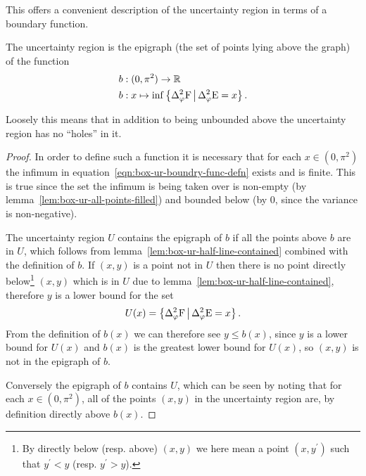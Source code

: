 This offers a convenient description of the uncertainty region in terms of a boundary function.
\begin{thm}
  The uncertainty region is the epigraph (the set of points lying above the graph) of the function
  \begin{align}
    b&:(0,\pi^2) \to \R\\
    b&:x\mapsto \inf\left\{\var[\varphi]{\opf}\,\middle|\,\var[\varphi]{\ope} = x\right\}.\label{eqn:box-ur-boundry-func-defn}
  \end{align}
\end{thm}
Loosely this means that in addition to being unbounded above the uncertainty region has no ``holes'' in it.
\begin{proof}
  In order to define such a function it is necessary that for each $x\in (0,\pi^2)$ the infimum in equation~\eqref{eqn:box-ur-boundry-func-defn} exists and is finite. This is true since the set the infimum is being taken over is non-empty (by lemma~\ref{lem:box-ur-all-points-filled}) and bounded below (by $0$, since the variance is non-negative). 

The uncertainty region $U$ contains the epigraph of $b$ if all the points above $b$ are in $U$, which follows from lemma~\ref{lem:box-ur-half-line-contained} combined with the definition of $b$. If $(x,y)$ is a point not in $U$ then there is no point directly below\footnote{By directly below (resp. above) $(x,y)$ we here mean a point $(x,y^\prime)$ such that $y^\prime < y$ (resp. $y^\prime > y$).} $(x,y)$ which is in $U$ due to lemma~\ref{lem:box-ur-half-line-contained}, therefore $y$ is a lower bound for the set
\begin{align}
  U(x) = \left\{\var[\varphi]{\opf}\,\middle|\,\var[\varphi]{\ope} = x\right\}.
\end{align}
From the definition of $b(x)$ we can therefore see $y \leq b(x)$, since $y$ is a lower bound for $U(x)$ and $b(x)$ is the greatest lower bound for $U(x)$, so $(x,y)$ is not in the epigraph of $b$. 

Conversely the epigraph of $b$ contains $U$, which can be seen by noting that for each $x\in (0,\pi^2)$, all of the points $(x,y)$ in the uncertainty region are, by definition directly above $b(x)$.
\end{proof}

